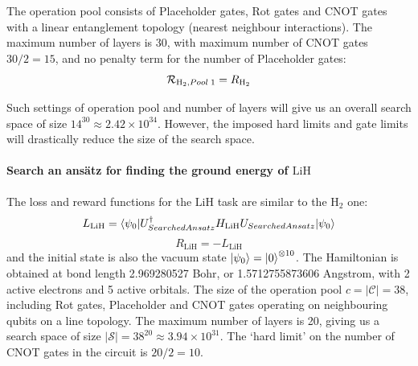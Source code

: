 \documentclass{ieeeaccess}
\begin{document}
The operation pool consists of Placeholder gates, Rot gates and CNOT gates with a linear entanglement topology (nearest neighbour interactions). The maximum number of layers is 30, with maximum number of CNOT gates $30/2 = 15$, and no penalty term for the number of Placeholder gates:
\begin{equation}
    \mathcal{R}_{\text{H}_2, \rm Pool\;1} = R_{\text{H}_2}
\end{equation}

Such settings of operation pool and number of layers will give us an overall search space of size $14^{30}\approx 2.42\times 10^{34}$. However, the imposed hard limits and gate limits will drastically reduce the size of the search space.


\paragraph{Search an ans\"atz for finding the ground energy of $\text{LiH}$}
The loss and reward functions for the $\text{LiH}$ task are similar to the $\text{H}_2$ one:
\begin{equation}
    L_{\text{LiH}} =\langle \psi_0 \vert U_{\rm SearchedAnsatz}^{\dagger} H_{\text{LiH}} U_{\rm SearchedAnsatz} \vert \psi_0\rangle
\end{equation}
\begin{equation}
    R_{\text{LiH}} = -L_{\text{LiH}}
\end{equation}
and the initial state is also the vacuum state $\ket{\psi_0} = \ket{0}^{\otimes 10}$. The Hamiltonian is obtained at bond length 2.969280527 Bohr, or 1.5712755873606 Angstrom, with 2 active electrons and 5 active orbitals. The size of the operation pool $c = \vert \mathcal{C} \vert = 38$, including Rot gates, Placeholder and CNOT gates operating on neighbouring qubits on a line topology. The maximum number of layers is 20, giving us a search space of size $\vert \mathcal{S} \vert = 38^{20} \approx 3.94\times 10^{31}$. The `hard limit' on the number of CNOT gates in the circuit is $20/2=10$.
\end{document}
